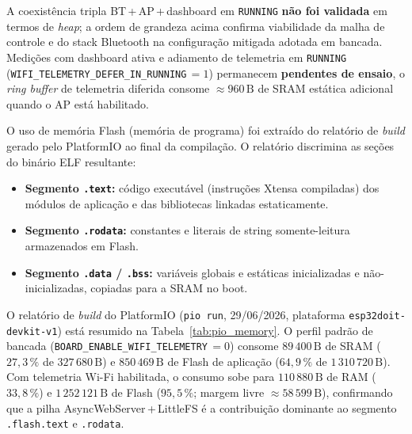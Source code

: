 \noindent A coexistência tripla BT\,+\,AP\,+\,dashboard em \texttt{RUNNING} \textbf{não foi validada} em termos de \textit{heap}; a ordem de grandeza acima confirma viabilidade da malha de controle e do stack Bluetooth na configuração mitigada adotada em bancada. Medições com dashboard ativa e adiamento de telemetria em \texttt{RUNNING} (\texttt{WIFI\_TELEMETRY\_DEFER\_IN\_RUNNING}\,$= 1$) permanecem \textbf{pendentes de ensaio}, o \textit{ring buffer} de telemetria diferida consome $\approx 960\,\text{B}$ de SRAM estática adicional quando o AP está habilitado.

O uso de memória Flash (memória de programa) foi extraído do relatório de \textit{build} gerado pelo PlatformIO ao final da compilação. O relatório discrimina as seções do binário ELF resultante:

\begin{itemize}
    \item \textbf{Segmento \texttt{.text}:} código executável (instruções Xtensa compiladas) dos módulos de aplicação e das bibliotecas linkadas estaticamente.
    \item \textbf{Segmento \texttt{.rodata}:} constantes e literais de string somente-leitura armazenados em Flash.
    \item \textbf{Segmento \texttt{.data} / \texttt{.bss}:} variáveis globais e estáticas inicializadas e não-inicializadas, copiadas para a SRAM no boot.
\end{itemize}

O relatório de \textit{build} do PlatformIO (\texttt{pio run}, 29/06/2026, plataforma \texttt{esp32doit-devkit-v1}) está resumido na Tabela~\ref{tab:pio_memory}. O perfil padrão de bancada (\texttt{BOARD\_ENABLE\_WIFI\_TELEMETRY}\,$= 0$) consome $89\,400\,\text{B}$ de SRAM ($27{,}3\,\%$ de $327\,680\,\text{B}$) e $850\,469\,\text{B}$ de Flash de aplicação ($64{,}9\,\%$ de $1\,310\,720\,\text{B}$). Com telemetria Wi-Fi habilitada, o consumo sobe para $110\,880\,\text{B}$ de RAM ($33{,}8\,\%$) e $1\,252\,121\,\text{B}$ de Flash ($95{,}5\,\%$; margem livre $\approx 58\,599\,\text{B}$), confirmando que a pilha AsyncWebServer\,+\,LittleFS é a contribuição dominante ao segmento \texttt{.flash.text} e \texttt{.rodata}.


